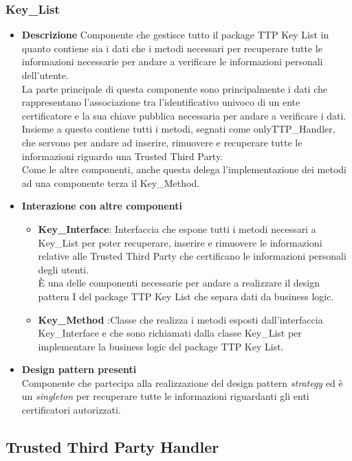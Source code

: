 \subsubsection{Key\_List}
\begin{itemize}
	\item \textbf{Descrizione}
	Componente che gestisce tutto il package TTP Key List in quanto contiene sia i dati che i metodi necessari per recuperare tutte le informazioni necessarie per andare a verificare le informazioni personali dell'utente.\\
	La parte principale di questa componente sono principalmente i dati che rappresentano l'associazione tra l'identificativo univoco di un ente certificatore e la sua chiave pubblica necessaria per andare a verificare i dati.\\
	Insieme a questo contiene tutti i metodi, segnati come onlyTTP\_Handler, che servono per andare ad inserire, rimuovere e recuperare tutte le informazioni riguardo una Trusted Third Party.\\
	Come le altre componenti, anche questa delega l'implementazione dei metodi ad una componente terza il Key\_Method.
	\item \textbf{Interazione con altre componenti}
	\begin{itemize}
		\item \textbf{Key\_Interface}: Interfaccia che espone tutti i metodi necessari a Key\_List per poter recuperare, inserire e rimuovere le informazioni relative alle Trusted Third Party che certificano le informazioni personali degli utenti.\\
		È una delle componenti necessarie per andare a realizzare il design pattern I del package TTP Key List che separa dati da business logic.
		\item \textbf{Key\_Method} :Classe che realizza i metodi esposti dall'interfaccia Key\_Interface e che sono richiamati dalla classe Key\_List per implementare la business logic del package TTP Key List.
	\end{itemize}
	\item \textbf{Design pattern presenti}\\
	Componente che partecipa alla realizzazione del design pattern \textit{strategy} ed è un \textit{singleton} per recuperare tutte le informazioni riguardanti gli enti certificatori autorizzati.
\end{itemize}
\subsection{Trusted Third Party Handler}

